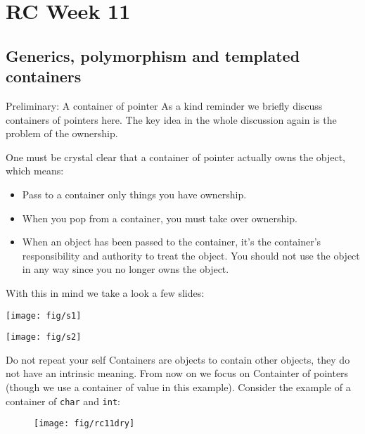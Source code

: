 \section{RC Week 11}
\subsection{Generics, polymorphism and templated containers}
\begin{frame}{Preliminary: A container of pointer}
As a kind reminder we briefly discuss containers of pointers here. The key idea in the whole discussion again is the problem of the ownership. 

One must be crystal clear that a container of pointer actually owns the object, which means:

\begin{itemize}
	\item Pass to a container only things you have ownership. 
	\item When you pop from a container, you must take over ownership. 
	\item When an object has been passed to the container, it's the container's responsibility and authority to treat the object. You should not use the object in any way since you no longer owns the object.
\end{itemize}

With this in mind we take a look a few slides:

\end{frame}

\begin{frame}
\texttt{[image: fig/s1]}
\end{frame}

\begin{frame}
\texttt{[image: fig/s2]}
\end{frame}

\begin{frame}{Do not repeat your self}
Containers are objects to contain other objects, they do not have an intrinsic meaning. From now on we focus on \alert{Containter of pointers} (though we use a container of value in this example). Consider the example of a container of \texttt{char} and \texttt{int}:

\vspace{-0.1in}
\begin{figure}
	\centering
	\texttt{[image: fig/rc11dry]}
\end{figure}

\end{frame}

